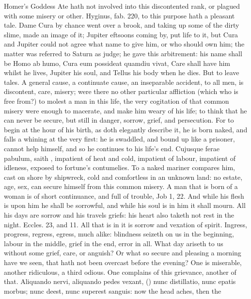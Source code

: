{{Homer's Goddess Ate hath not involved into this discontented
rank, or plagued with some misery or other. Hyginus, fab. 220, to
this purpose hath a pleasant tale. Dame Cura by chance went over a
brook, and taking up some of the dirty slime, made an image of it;
Jupiter eftsoons coming by, put life to it, but Cura and Jupiter could
not agree what name to give him, or who should own him; the matter was
referred to Saturn as judge; he gave this arbitrement: his name shall
be Homo ab humo, Cura eum possideat quamdiu vivat, Care shall have him
whilst he lives, Jupiter his soul, and Tellus his body when he dies.
But to leave tales. A general cause, a continuate cause, an inseparable
accident, to all men, is discontent, care, misery; were there no other
particular affliction (which who is free from?) to molest a man in this
life, the very cogitation of that common misery were enough to
macerate, and make him weary of his life; to think that he can never be
secure, but still in danger, sorrow, grief, and persecution. For to
begin at the hour of his birth, as \Pliny{} doth elegantly describe
it, he is born naked, and falls a whining at the very first: he
is swaddled, and bound up like a prisoner, cannot help himself, and so
he continues to his life's end. Cujusque ferae pabulum, saith
\Seneca, impatient of heat and cold, impatient of labour,
impatient of idleness, exposed to fortune's contumelies. To a naked
mariner \Lucretius{} compares him, cast on shore by shipwreck, cold and
comfortless in an unknown land: no estate, age, sex, can secure
himself from this common misery. A man that is born of a woman is of
short continuance, and full of trouble, Job  1, 22. And while his
flesh is upon him he shall be sorrowful, and while his soul is in him
it shall mourn. All his days are sorrow and his travels griefs: his
heart also taketh not rest in the night. Eccles.  23, and  11.
All that is in it is sorrow and vexation of spirit. Ingress,
progress, regress, egress, much alike: blindness seizeth on us in the
beginning, labour in the middle, grief in the end, error in all. What
day ariseth to us without some grief, care, or anguish? Or what so
secure and pleasing a morning have we seen, that hath not been overcast
before the evening? One is miserable, another ridiculous, a third
odious. One complains of this grievance, another of that. Aliquando
nervi, aliquando pedes vexant, (\Seneca) nunc distillatio, nunc epatis
morbus; nunc deest, nunc superest sanguis: now the head aches, then the
}}
